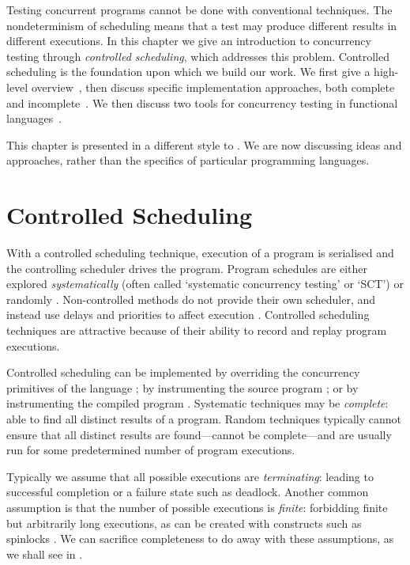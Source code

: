 Testing concurrent programs cannot be done with conventional
techniques.  The nondeterminism of scheduling means that a test may
produce different results in different executions.  In this chapter we
give an introduction to concurrency testing through \emph{controlled
  scheduling}, which addresses this problem.  Controlled scheduling is
the foundation upon which we build our work.  We first give a
high-level overview~, then discuss specific
implementation approaches, both complete~ and
incomplete~.  We then discuss two tools for
concurrency testing in functional languages~.

This chapter is presented in a different style to
.  We are now discussing ideas and
approaches, rather than the specifics of particular programming
languages.

\section{Controlled Scheduling}
\label{sec:sct-fundamentals}

With a controlled scheduling technique, execution of a program is
serialised and the controlling scheduler drives the program.  Program
schedules are either explored
\emph{systematically} \parencite{coons2013,flanagan2005,musuvathi2008,musuvathi2007}
(often called `systematic concurrency testing' or `SCT') or
randomly \parencite{burckhardt2010,thomson2016}.  Non-controlled methods do
not provide their own scheduler, and instead use delays and priorities
to affect execution \parencite{yu2012}.  Controlled scheduling techniques
are attractive because of their ability to record and replay program
executions.

Controlled scheduling can be implemented by overriding the concurrency
primitives of the language \parencite{walker2015}; by instrumenting the
source program \parencite{claessen2009}; or by instrumenting the compiled
program \parencite{musuvathi2006,yu2012}.  Systematic techniques may be
\emph{complete}: able to find all distinct results of a program.
Random techniques typically cannot ensure that all distinct results
are found---cannot be complete---and are usually run for some
predetermined number of program executions.

Typically we assume that all possible executions are
\emph{terminating}: leading to successful completion or a failure
state such as deadlock.  Another common assumption is that the number
of possible executions is \emph{finite}: forbidding finite but
arbitrarily long executions, as can be created with constructs such as
spinlocks \parencite{siberschatz1993}.  We can sacrifice completeness to do
away with these assumptions, as we shall see in
.

